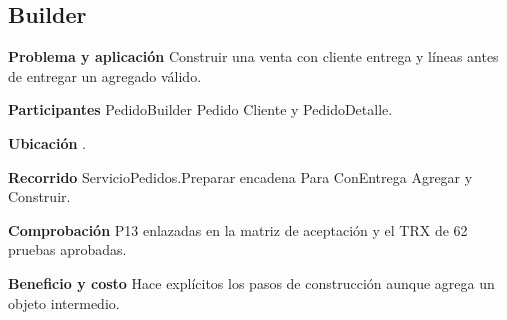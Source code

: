 \noindent\begin{minipage}{\linewidth}
\subsection{Builder}
\textbf{Problema y aplicación} Construir una venta con cliente entrega y líneas antes de entregar un agregado válido.

\textbf{Participantes} PedidoBuilder Pedido Cliente y PedidoDetalle.

\textbf{Ubicación} \href{https://github.com/Alan77-bot/LogiMarket360Alan/blob/68bda51063441415524ede51bdf61649ee9b4973/LogiMarket.Domain/Pedidos/PedidoBuilder.cs#L31}{}.

\textbf{Recorrido} ServicioPedidos.Preparar encadena Para ConEntrega Agregar y Construir.


\textbf{Comprobación} P13 enlazadas en la matriz de aceptación y el TRX de 62 pruebas aprobadas.

\textbf{Beneficio y costo} Hace explícitos los pasos de construcción aunque agrega un objeto intermedio.

\end{minipage}\par\smallskip
